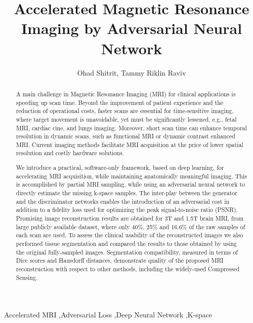\documentclass[review]{elsarticle}
\begin{document}
\begin{frontmatter}

\title{Accelerated Magnetic Resonance Imaging by Adversarial Neural Network}

\author{Ohad Shitrit, Tammy Riklin Raviv}
\address{$^1$Department of Electrical Engineering, 
	     $^2$The Zlotowski Center for Neuroscience
	     Ben-Gurion University of the Negev, Israel}

\begin{abstract}
A main challenge in Magnetic Resonance Imaging (MRI) for clinical applications is speeding up scan time. Beyond the improvement of patient experience and the reduction of operational costs, faster scans are essential for time-sensitive imaging, where target movement is unavoidable, yet must be significantly lessened, e.g., fetal MRI, cardiac cine, and lungs imaging. Moreover, short scan time can enhance temporal resolution in dynamic scans, such as functional MRI or dynamic contrast enhanced MRI. Current imaging methods facilitate MRI acquisition at the price of lower spatial resolution and costly hardware solutions.

We introduce a practical, software-only framework, based on deep learning, for accelerating MRI acquisition, while maintaining anatomically meaningful imaging. This is accomplished by partial MRI sampling, while using an adversarial neural network to directly estimate the missing k-space samples. The inter-play between the generator and the discriminator networks enables the introduction of an adversarial cost in addition to a fidelity loss used for optimizing the peak signal-to-noise ratio (PSNR). Promising image reconstruction results are obtained for 3T and 1.5T brain MRI, from large publicly available dataset, where only 40\%, 25\% and 16.6\% of the raw samples of each scan are used. To assess the clinical usability of the reconstructed images we also performed tissue segmentation and compared the results to those obtained by using the original fully-sampled images.
Segmentation compatibility, measured in terms of Dice scores and Hausdorff distances, demonstrate quality of the proposed MRI reconstruction with respect to other methods, including the widely-used Compressed Sensing.

\end{abstract}

\begin{keyword}
\text Accelerated MRI \sep Adversarial Loss \sep Deep Neural Network \sep K-space
\end{keyword}

\end{frontmatter}
\end{document}
